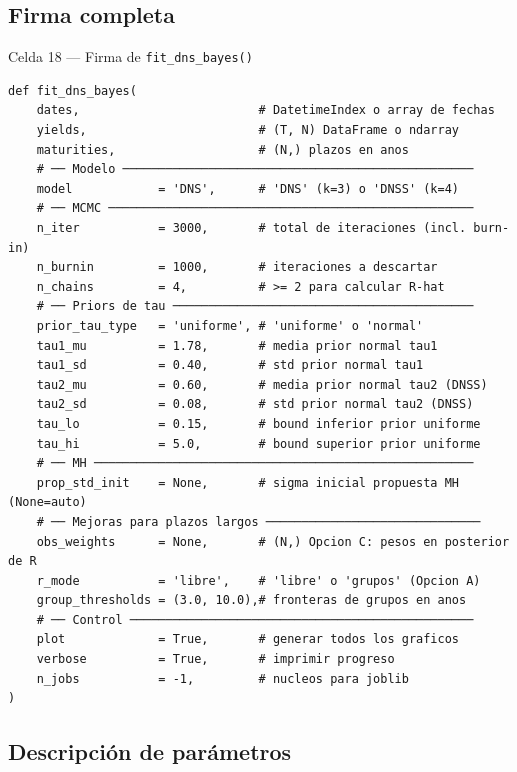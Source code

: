 \documentclass[12pt, a4paper]{article}
\theoremstyle{plain}
\theoremstyle{definition}
\theoremstyle{remark}
\begin{document}
\subsection{Firma completa}

\begin{codigocaja}{Celda 18 — Firma de \texttt{fit\_dns\_bayes()}}
\begin{lstlisting}
def fit_dns_bayes(
    dates,                         # DatetimeIndex o array de fechas
    yields,                        # (T, N) DataFrame o ndarray
    maturities,                    # (N,) plazos en anos
    # ── Modelo ─────────────────────────────────────────────────
    model            = 'DNS',      # 'DNS' (k=3) o 'DNSS' (k=4)
    # ── MCMC ───────────────────────────────────────────────────
    n_iter           = 3000,       # total de iteraciones (incl. burn-in)
    n_burnin         = 1000,       # iteraciones a descartar
    n_chains         = 4,          # >= 2 para calcular R-hat
    # ── Priors de tau ──────────────────────────────────────────
    prior_tau_type   = 'uniforme', # 'uniforme' o 'normal'
    tau1_mu          = 1.78,       # media prior normal tau1
    tau1_sd          = 0.40,       # std prior normal tau1
    tau2_mu          = 0.60,       # media prior normal tau2 (DNSS)
    tau2_sd          = 0.08,       # std prior normal tau2 (DNSS)
    tau_lo           = 0.15,       # bound inferior prior uniforme
    tau_hi           = 5.0,        # bound superior prior uniforme
    # ── MH ─────────────────────────────────────────────────────
    prop_std_init    = None,       # sigma inicial propuesta MH (None=auto)
    # ── Mejoras para plazos largos ──────────────────────────────
    obs_weights      = None,       # (N,) Opcion C: pesos en posterior de R
    r_mode           = 'libre',    # 'libre' o 'grupos' (Opcion A)
    group_thresholds = (3.0, 10.0),# fronteras de grupos en anos
    # ── Control ────────────────────────────────────────────────
    plot             = True,       # generar todos los graficos
    verbose          = True,       # imprimir progreso
    n_jobs           = -1,         # nucleos para joblib
)
\end{lstlisting}
\end{codigocaja}

\subsection{Descripción de parámetros}
\end{document}
